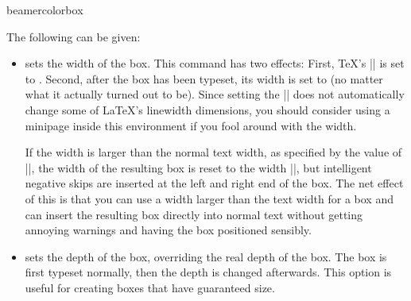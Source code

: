 \begin{environment}{{beamercolorbox}}
  
  The following  can be given:
  \begin{itemize}
  \item {} sets the width of the box. This
    command has two effects: First, \TeX's |\hsize| is set to
    . Second, after the box has been typeset, its width is
    set to  (no matter what it actually turned out to
    be). Since setting the |\hsize| does not automatically change some
    of \LaTeX's linewidth dimensions, you should consider using a
    minipage inside this environment if you fool around with the
    width.

    If the width is larger than the normal text width, as specified by
    the value of |\textwidth|, the width of the resulting box is reset
    to the width |\textwidth|, but intelligent negative skips are
    inserted at the left and right end of the box. The net effect of
    this is that you can use a width larger than the text width for a
    box and can insert the resulting box directly into normal text
    without getting annoying warnings and having the box positioned
    sensibly.
  \item {} sets the depth of the box,
    overriding the real depth of the box. The box is first typeset
    normally, then the depth is changed afterwards. This option is
    useful for creating boxes that have guaranteed size.


\end{itemize}
\end{environment}
